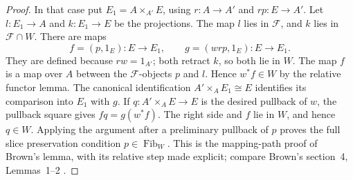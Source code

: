 \begin{proof}
In that case put $E_1=A\times_{A'}E$, using $r:A\to A'$ and $rp:E\to A'$. Let $l:E_1\to A$ and $k:E_1\to E$ be the projections. The map $l$ lies in $\mathcal F$, and $k$ lies in $\mathcal F\cap W$. There are maps
\[
f=(p,1_E):E\to E_1,
\qquad g=(wrp,1_E):E\to E_1.
\]
They are defined because $rw=1_{A'}$; both retract $k$, so both lie in $W$. The map $f$ is a map over $A$ between the $\mathcal F$-objects $p$ and $l$. Hence $w^*f\in W$ by the relative functor lemma. The canonical identification $A'\times_A E_1\cong E$ identifies its comparison into $E_1$ with $g$. If $q:A'\times_AE\to E$ is the desired pullback of $w$, the pullback square gives $fq=g(w^*f)$. The right side and $f$ lie in $W$, and hence $q\in W$. Applying the argument after a preliminary pullback of $p$ proves the full slice preservation condition $p\in\operatorname{Fib}_W$. This is the mapping-path proof of Brown's lemma, with its relative step made explicit; compare Brown's section~4, Lemmas~1--2 \citep{BISITEBrown1973}.
\end{proof}

